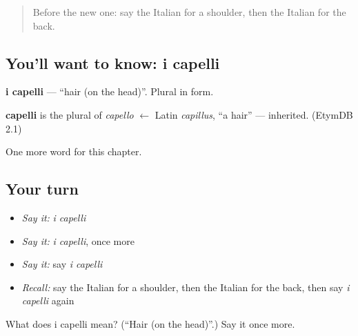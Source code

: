 \begin{quote}
Before the new one: say the Italian for a shoulder, then the Italian for the back.
\end{quote}

\subsection*{You'll want to know: i capelli}
\textbf{i capelli} — \textquotedblleft{}hair (on the head)\textquotedblright{}. Plural in form.

\begin{cousinweb}
\textbf{capelli} is the plural of \emph{capello} $\leftarrow$ Latin \emph{capillus}, \textquotedblleft{}a hair\textquotedblright{} — inherited. (EtymDB 2.1)
\end{cousinweb}

\begin{grammarlens}[title={What you've built}]
One more word for this chapter.
\end{grammarlens}

\subsection*{Your turn}
\begin{itemize}
\raggedright
  \item \emph{Say it:} \emph{i capelli}
  \item \emph{Say it:} \emph{i capelli}, once more
  \item \emph{Say it:} say \emph{i capelli}
  \item \emph{Recall:} say the Italian for a shoulder, then the Italian for the back, then say \emph{i capelli} again
\end{itemize}

\begin{tcolorbox}[breakable,colback=teal!4,colframe=teal!35!black,title={Before you move on}]
What does i capelli mean? (\textquotedblleft{}Hair (on the head)\textquotedblright{}.) Say it once more.
\end{tcolorbox}
